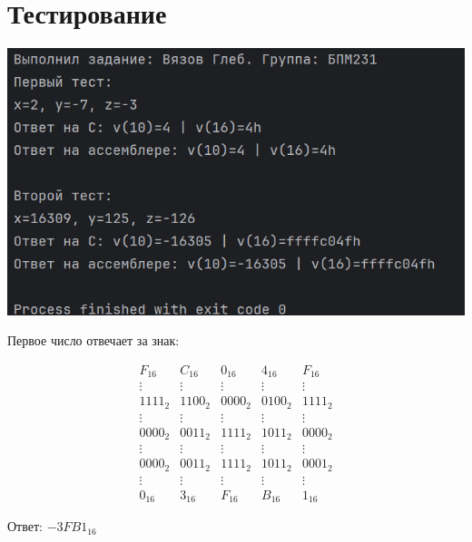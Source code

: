 \documentclass[12pt]{article}
\begin{document}
\section*{Тестирование}

    \includegraphics[width=\linewidth]{img1}
    
	Первое число отвечает за знак:    
    
    $$
    \begin{array}{ccccc}
    F_{16} & C_{16} & 0_{16} & 4_{16} & F_{16} \\
    \vdots& \vdots & \vdots & \vdots & \vdots \\
    1111_2 & 1100_2 & 0000_2 & 0100_2 & 1111_2 \\
    \vdots& \vdots & \vdots & \vdots & \vdots \\
    0000_2 & 0011_2 & 1111_2 & 1011_2 & 0000_2 \\
    \vdots& \vdots & \vdots & \vdots & \vdots \\
    0000_2 & 0011_2 & 1111_2 & 1011_2 & 0001_2 \\
    \vdots& \vdots & \vdots & \vdots & \vdots \\
    0_{16} & 3_{16} & F_{16} & B_{16} & 1_{16}
    \end{array}
    $$
    
    Ответ: $-3FB1_{16}$
\end{document}
